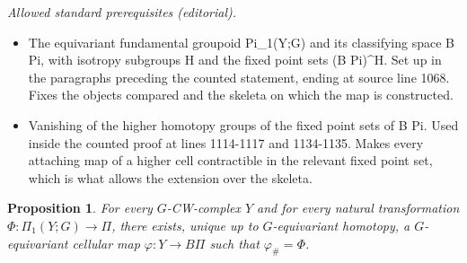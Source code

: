 \documentclass[10pt,a4paper]{amsart}
\newtheorem{Proposition}[Theorem]{Proposition}
{ \theoremstyle{definition}
	\newtheorem{Definition}[Theorem]{Definition}
	\newtheorem{Note}[Theorem]{Note}
	\newtheorem{Example}[Theorem]{Example}
	\newtheorem{Remark}[Theorem]{Remark} }
\begin{document}
\noindent\textit{Allowed standard prerequisites (editorial).}\begin{itemize}
\item The equivariant fundamental groupoid Pi\_1(Y;G) and its classifying space B Pi, with isotropy subgroups H and the fixed point sets (B Pi)\textasciicircum{}H. Set up in the paragraphs preceding the counted statement, ending at source line 1068. Fixes the objects compared and the skeleta on which the map is constructed.
\item Vanishing of the higher homotopy groups of the fixed point sets of B Pi. Used inside the counted proof at lines 1114-1117 and 1134-1135. Makes every attaching map of a higher cell contractible in the relevant fixed point set, which is what allows the extension over the skeleta.
\end{itemize}\medskip
	\begin{Proposition}\label{universalspace}
		For every $G$-CW-complex $Y$ and for every natural transformation $\Phi\colon
		\Pi_1(Y;\allowbreak G)\to \Pi$, there exists, unique up to $G$-equivariant
		homotopy, a $G$-equivariant cellular map
		$\varphi\colon Y\to B \Pi$
		such that
		$\varphi_{\#}=\Phi$.
	\end{Proposition}
\end{document}
